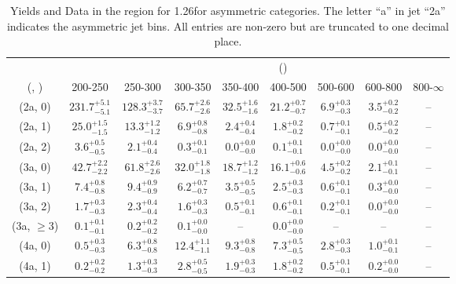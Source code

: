 \begin{table}[h!]
\tiny
\centering
\caption{Yields and Data in the \mmj region for 1.26\ifb for asymmetric categories. The letter ``a'' in jet \eg ``2a''  indicates the asymmetric jet bins. All entries are non-zero but are truncated to one decimal place.\label{tab:yieldsnodata_mumu_comb_asym}}
\begin{tabular}
{ccccccccc}
	\hline\hline
&	& \multicolumn{8}{c}{\scalht (\gev)} \\ 
	 (\njet,  \nb) & 200-250 & 250-300 & 300-350 & 350-400 & 400-500 & 500-600 & 600-800 & 800-$\infty$ \\ [0.8ex] 
\hline
	(2a, 0) & $231.7^{+ 5.1 }_{- 5.1 }$ & $128.3^{+ 3.7 }_{- 3.7 }$ & $65.7^{+ 2.6 }_{- 2.6 }$ & $32.5^{+ 1.6 }_{- 1.6 }$ & $21.2^{+ 0.7 }_{- 0.7 }$ & $6.9^{+ 0.3 }_{- 0.3 }$ & $3.5^{+ 0.2 }_{- 0.2 }$ & -- \\[0.5ex] 
	(2a, 1) & $25.0^{+ 1.5 }_{- 1.5 }$ & $13.3^{+ 1.2 }_{- 1.2 }$ & $6.9^{+ 0.8 }_{- 0.8 }$ & $2.4^{+ 0.4 }_{- 0.4 }$ & $1.8^{+ 0.2 }_{- 0.2 }$ & $0.7^{+ 0.1 }_{- 0.1 }$ & $0.5^{+ 0.2 }_{- 0.2 }$ & -- \\[0.5ex] 
	(2a, 2) & $3.6^{+ 0.5 }_{- 0.5 }$ & $2.1^{+ 0.4 }_{- 0.4 }$ & $0.3^{+ 0.1 }_{- 0.1 }$ & $0.0^{+ 0.0 }_{- 0.0 }$ & $0.1^{+ 0.1 }_{- 0.1 }$ & $0.0^{+ 0.0 }_{- 0.0 }$ & $0.0^{+ 0.0 }_{- 0.0 }$ & -- \\[0.5ex] 
	(3a, 0) & $42.7^{+ 2.2 }_{- 2.2 }$ & $61.8^{+ 2.6 }_{- 2.6 }$ & $32.0^{+ 1.8 }_{- 1.8 }$ & $18.7^{+ 1.2 }_{- 1.2 }$ & $16.1^{+ 0.6 }_{- 0.6 }$ & $4.5^{+ 0.2 }_{- 0.2 }$ & $2.1^{+ 0.1 }_{- 0.1 }$ & -- \\[0.5ex] 
	(3a, 1) & $7.4^{+ 0.8 }_{- 0.8 }$ & $9.4^{+ 0.9 }_{- 0.9 }$ & $6.2^{+ 0.7 }_{- 0.7 }$ & $3.5^{+ 0.5 }_{- 0.5 }$ & $2.5^{+ 0.3 }_{- 0.3 }$ & $0.6^{+ 0.1 }_{- 0.1 }$ & $0.3^{+ 0.0 }_{- 0.0 }$ & -- \\[0.5ex] 
	(3a, 2) & $1.7^{+ 0.3 }_{- 0.3 }$ & $2.3^{+ 0.4 }_{- 0.4 }$ & $1.6^{+ 0.3 }_{- 0.3 }$ & $0.5^{+ 0.1 }_{- 0.1 }$ & $0.6^{+ 0.1 }_{- 0.1 }$ & $0.2^{+ 0.1 }_{- 0.1 }$ & $0.0^{+ 0.0 }_{- 0.0 }$ & -- \\[0.5ex] 
	(3a, $\ge3$) & $0.1^{+ 0.1 }_{- 0.1 }$ & $0.2^{+ 0.2 }_{- 0.2 }$ & $0.1^{+ 0.0 }_{- 0.0 }$ & -- & $0.0^{+ 0.0 }_{- 0.0 }$ & -- & -- & -- \\[0.5ex] 
	(4a, 0) & $0.5^{+ 0.3 }_{- 0.3 }$ & $6.3^{+ 0.8 }_{- 0.8 }$ & $12.4^{+ 1.1 }_{- 1.1 }$ & $9.3^{+ 0.8 }_{- 0.8 }$ & $7.3^{+ 0.5 }_{- 0.5 }$ & $2.8^{+ 0.3 }_{- 0.3 }$ & $1.0^{+ 0.1 }_{- 0.1 }$ & -- \\[0.5ex] 
	(4a, 1) & $0.2^{+ 0.2 }_{- 0.2 }$ & $1.3^{+ 0.3 }_{- 0.3 }$ & $2.8^{+ 0.5 }_{- 0.5 }$ & $1.9^{+ 0.3 }_{- 0.3 }$ & $1.8^{+ 0.2 }_{- 0.2 }$ & $0.5^{+ 0.1 }_{- 0.1 }$ & $0.2^{+ 0.0 }_{- 0.0 }$ & -- \\[0.5ex] 

\end{tabular}
\end{table}
